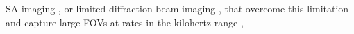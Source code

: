 \ac{SA} imaging
\cite{article:MoghimiradITUFFC2016,article:JensenUlt2006}, or
limited-diffraction beam imaging
\cite{article:ChengITUFFC2006,article:LuITUFFC1997}, that overcome
this limitation and capture
large \acp{FOV} at
rates in
the kilohertz range
\cite{article:TanterITUFFC2014},
